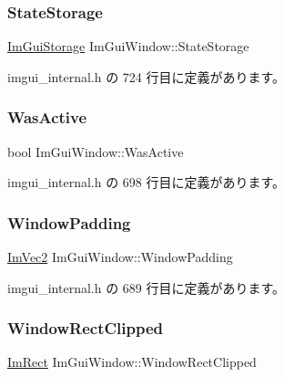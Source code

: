 \subsubsection{\texorpdfstring{State\+Storage}{StateStorage}}
{\footnotesize\ttfamily \mbox{\hyperlink{struct_im_gui_storage}{Im\+Gui\+Storage}} Im\+Gui\+Window\+::\+State\+Storage}



 imgui\+\_\+internal.\+h の 724 行目に定義があります。

\mbox{\label{struct_im_gui_window_ab346ec3a2f305948af05ec1871610a8f}} 
\subsubsection{\texorpdfstring{Was\+Active}{WasActive}}
{\footnotesize\ttfamily bool Im\+Gui\+Window\+::\+Was\+Active}



 imgui\+\_\+internal.\+h の 698 行目に定義があります。

\mbox{\label{struct_im_gui_window_a538d3d70ad8f71a4ec58a6a0560b2f02}} 
\subsubsection{\texorpdfstring{Window\+Padding}{WindowPadding}}
{\footnotesize\ttfamily \mbox{\hyperlink{struct_im_vec2}{Im\+Vec2}} Im\+Gui\+Window\+::\+Window\+Padding}



 imgui\+\_\+internal.\+h の 689 行目に定義があります。

\mbox{\label{struct_im_gui_window_ae0af9ff6c93baad6848143dd9d742ddd}} 
\subsubsection{\texorpdfstring{Window\+Rect\+Clipped}{WindowRectClipped}}
{\footnotesize\ttfamily \mbox{\hyperlink{struct_im_rect}{Im\+Rect}} Im\+Gui\+Window\+::\+Window\+Rect\+Clipped}



